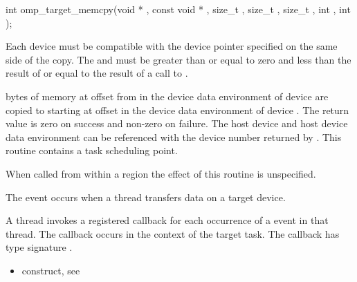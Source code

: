 \begin{ccppspecific}
\begin{figure}[t!]
\end{figure}

\format
\begin{boxedcode}
int omp\_target\_memcpy(void * , const void * ,
                        size\_t , size\_t ,
                        size\_t , int ,
                        int );
\end{boxedcode}

\constraints
Each device must
be compatible with the device pointer specified on the same side of the copy.
The  and 
must be greater than or equal to zero and less than the result of
 or equal to the result of a call to
.

\effect


 bytes of memory at offset  from  
in the device data environment of device  are
copied to  starting at offset  in the device data
environment of device .  
The return value is zero on success and non-zero on failure.  The host device
and host device data environment can be referenced with the device number
returned by . This routine contains a task
scheduling point.

When called from within a  region 
the effect of this routine is unspecified.

\events
The  event occurs when a thread transfers data on a target device.

\begin{figure}[t!]
\end{figure}

\tools
A thread invokes a registered 
callback for each occurrence of a  event in that thread. 
The callback occurs in the context of the target task.  The callback has type signature
. 


\crossreferences
\begin{itemize}
\item {} construct, see 


\end{itemize}
\end{ccppspecific}
